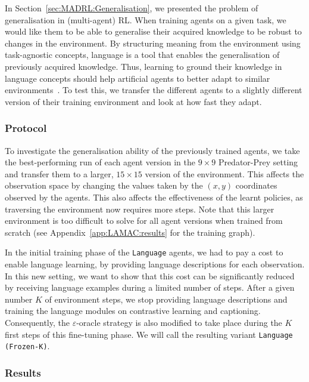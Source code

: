 In Section~\ref{sec:MADRL:Generalisation}, we presented the problem of generalisation in (multi-agent) RL. When training agents on a given task, we would like them to be able to generalise their acquired knowledge to be robust to changes in the environment. By structuring meaning from the environment using task-agnostic concepts, language is a tool that enables the generalisation of previously acquired knowledge. Thus, learning to ground their knowledge in language concepts should help artificial agents to better adapt to similar environments~\citep{Narasimhan2018_Transfer}. To test this, we transfer the different agents to a slightly different version of their training environment and look at how fast they adapt.  

\subsubsection{Protocol}

To investigate the generalisation ability of the previously trained agents, we take the best-performing run of each agent version in the $9\times 9$ Predator-Prey setting and transfer them to a larger, $15\times 15$ version of the environment. This affects the observation space by changing the values taken by the $(x,y)$ coordinates observed by the agents. This also affects the effectiveness of the learnt policies, as traversing the environment now requires more steps. Note that this larger environment is too difficult to solve for all agent versions when trained from scratch (see Appendix~\ref{app:LAMAC:results} for the training graph). 

In the initial training phase of the \texttt{Language} agents, we had to pay a cost to enable language learning, by providing language descriptions for each observation. In this new setting, we want to show that this cost can be significantly reduced by receiving language examples during a limited number of steps. After a given number $K$ of environment steps, we stop providing language descriptions and training the language modules on contrastive learning and captioning. Consequently, the $\varepsilon$-oracle strategy is also modified to take place during the $K$ first steps of this fine-tuning phase. We will call the resulting variant \texttt{Language (Frozen-K)}. 

\subsubsection{Results}


